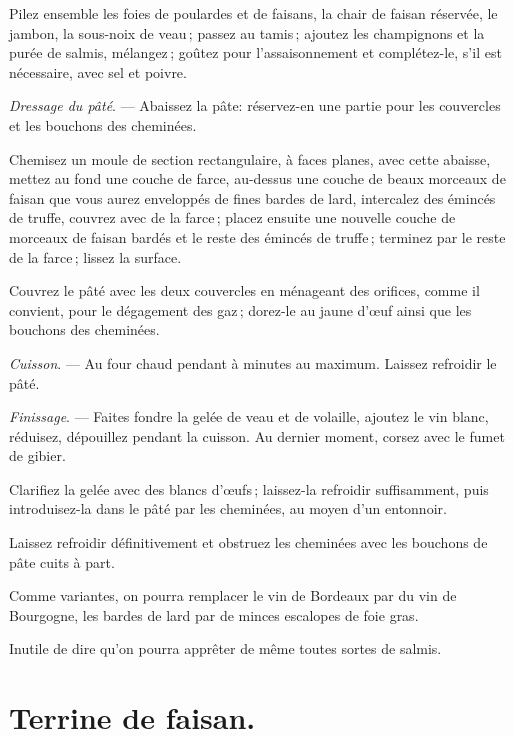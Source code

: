 Pilez ensemble les foies de poulardes et de faisans, la chair de faisan
réservée, le jambon, la sous-noix de veau ; passez au tamis ; ajoutez les
champignons et la purée de salmis, mélangez ; goûtez pour l’assaisonnement et
complétez-le, s'il est nécessaire, avec sel et poivre.

\medskip

\textit{Dressage du pâté}. — Abaissez la pâte: réservez-en une partie pour les
couvercles et les bouchons des cheminées.

Chemisez un moule de section rectangulaire, à faces planes, avec cette abaisse,
mettez au fond une couche de farce, au-dessus une couche de beaux morceaux de
faisan que vous aurez enveloppés de fines bardes de lard, intercalez des
émincés de truffe, couvrez avec de la farce ; placez ensuite une nouvelle
couche de morceaux de faisan bardés et le reste des émincés de truffe ;
terminez par le reste de la farce ; lissez la surface.

Couvrez le pâté avec les deux couvercles en ménageant des orifices, comme il
convient, pour le dégagement des gaz ; dorez-le au jaune d'œuf ainsi que les
bouchons des cheminées.

\medskip

\textit{Cuisson}. — Au four chaud pendant {\mmm} à {\mmm} minutes
au maximum. Laissez refroidir le pâté.

\medskip

\textit{Finissage}. — Faites fondre la gelée de veau et de volaille, ajoutez le
vin blanc, réduisez, dépouillez pendant la cuisson. Au dernier moment, corsez
avec le fumet de gibier.

Clarifiez la gelée avec des blancs d'œufs ; laissez-la refroidir suffisamment,
puis introduisez-la dans le pâté par les cheminées, au moyen d'un entonnoir.

Laissez refroidir définitivement et obstruez les cheminées avec les bouchons de
pâte cuits à part.

\sk

Comme variantes, on pourra remplacer le vin de Bordeaux par du vin de
Bourgogne, les bardes de lard par de minces escalopes de foie gras.

\sk

Inutile de dire qu'on pourra apprêter de même toutes sortes de salmis.

\section*{\centering Terrine de faisan.}
{}

